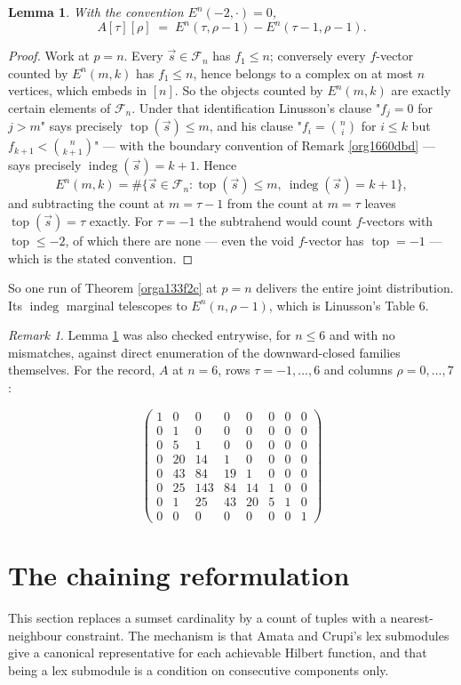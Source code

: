 \documentclass[11pt, a4paper, abstract=yes]{scrartcl}
\theoremstyle{definition}
\theoremstyle{remark}
\newtheorem{remark}[definition]{Remark}
\theoremstyle{plain}
\newtheorem{lemma}[definition]{Lemma}
\newcommand{\vek}[1]{\boldsymbol{#1}}
\newcommand{\indeg}{\operatorname{indeg}}
\newcommand{\tp}{\operatorname{top}}
\renewcommand{\vek}[1]{\vec{#1}}
\begin{document}
\begin{lemma}
With the convention \(E^n(-2,\cdot)=0\),
\[
  A[\tau][\rho]\;=\;E^n(\tau,\rho-1)-E^n(\tau-1,\rho-1).
\]
\label{org3782858}
\end{lemma}

\begin{proof}
Work at \(p=n\). Every \(\vek s\in\mathcal F_n\) has \(f_1\le n\); conversely every \(f\)-vector counted by
\(E^n(m,k)\) has \(f_1\le n\), hence belongs to a complex on at most \(n\) vertices, which embeds in
\([n]\). So the objects counted by \(E^n(m,k)\) are exactly certain elements of \(\mathcal F_n\).
Under that identification Linusson's clause "\(f_j=0\) for \(j>m\)" says precisely \(\tp(\vek s)\le m\),
and his clause "\(f_i=\binom ni\) for \(i\le k\) but \(f_{k+1}<\binom n{k+1}\)" --- with the boundary
convention of Remark \ref{org1660dbd} --- says precisely \(\indeg(\vek s)=k+1\). Hence
\[
  E^n(m,k)=\#\lbrace \vek s\in\mathcal F_n:\tp(\vek s)\le m,\ \indeg(\vek s)=k+1\rbrace ,
\]
and subtracting the count at \(m=\tau-1\) from the count at \(m=\tau\) leaves \(\tp(\vek s)=\tau\)
exactly. For \(\tau=-1\) the subtrahend would count \(f\)-vectors with \(\tp\le-2\), of which there
are none --- even the void \(f\)-vector has \(\tp=-1\) --- which is the stated convention.
\end{proof}

So one run of Theorem \ref{orga133f2c} at \(p=n\) delivers the entire joint distribution. Its
\(\indeg\) marginal telescopes to \(E^n(n,\rho-1)\), which is Linusson's Table 6.

\begin{remark}
Lemma \ref{org3782858} was also checked entrywise, for \(n\le6\) and with no mismatches, against
direct enumeration of the downward-closed families themselves. For the record, \(A\) at \(n=6\), rows \(\tau=-1,\dots,6\) and
columns \(\rho=0,\dots,7\):
\label{orge9c0315}
\end{remark}

\[
\begin{pmatrix}
1&0&0&0&0&0&0&0\\
0&1&0&0&0&0&0&0\\
0&5&1&0&0&0&0&0\\
0&20&14&1&0&0&0&0\\
0&43&84&19&1&0&0&0\\
0&25&143&84&14&1&0&0\\
0&1&25&43&20&5&1&0\\
0&0&0&0&0&0&0&1
\end{pmatrix}
\]
\section{The chaining reformulation}
\label{sec:org3b10bdb}
This section replaces a sumset cardinality by a count of tuples with a nearest-neighbour constraint.
The mechanism is that Amata and Crupi's lex submodules give a canonical representative for each
achievable Hilbert function, and that being a lex submodule is a condition on consecutive components
only.
\end{document}
